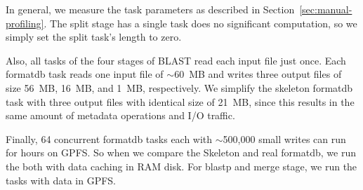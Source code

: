 \documentclass[preprint,12pt]{elsarticle}
\newcommand{\zhaonote}[1]{{\textcolor{darkgreen}{ ***Zhao:  #1 }}}
\newcommand{\zhaonote}[1]{}
\begin{document}

In general, we measure the task parameters as described in Section~\ref{sec:manual-profiling}.
The split stage has a single task does no significant 
computation, so we simply set the split task's length to zero. 


Also, all tasks of the four stages of BLAST read each input file just once. Each formatdb task reads one input file of $\sim$60~MB 
and writes three output files of size 56~MB, 16~MB, and 1~MB, respectively. We simplify the skeleton formatdb task with three
output files with identical size of 21~MB, since this results in the same amount of metadata operations and I/O traffic.

Finally, 64 concurrent formatdb tasks each with $\sim$500,000 small writes can run for hours on
GPFS. So when we compare the Skeleton and real formatdb, we run the both with data caching in RAM disk. For blastp and merge stage, we run the tasks with data in GPFS.

\end{document}
